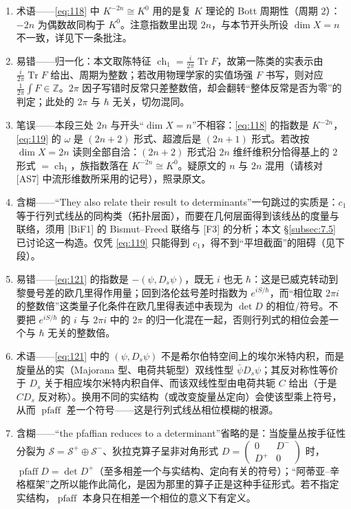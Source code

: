 \documentclass[11pt]{amsart}
\theoremstyle{definition}
\theoremstyle{remark}
\theoremstyle{plain}
\numberwithin{equation}{section}
\renewcommand{\:}{\colon}
\DeclareMathOperator{\Tr}{Tr}
\newcommand{\ZZ}{{\mathbb Z}}
\DeclareMathOperator{\ch}{ch}
\DeclareMathOperator{\pfaff}{pfaff}
\newcommand{\sS}{\mathscr{S}}
\begin{document}
\begin{enumerate}[leftmargin=2.2em,itemsep=2pt,topsep=2pt]
  \item 术语——\eqref{eq:118} 中 $K^{-2n}\cong K^0$ 用的是复 $K$ 理论的 Bott 周期性（周期 $2$）：$-2n$ 为偶数故同构于 $K^0$。注意指数里出现 $2n$，与本节开头所设 $\dim X=n$ 不一致，详见下一条批注。
  \item 易错——归一化：本文取陈特征 $\ch_1=\frac{i}{2\pi}\Tr F$，故第一陈类的实表示由 $\frac{i}{2\pi}\Tr F$ 给出、周期为整数；若改用物理学家的实值场强 $F$ 书写，则对应 $\frac{1}{2\pi}\int F\in \ZZ$。$2\pi$ 因子写错时反常只差整数倍，却会翻转“整体反常是否为零”的判定；此处的 $2\pi$ 与 $\hbar$ 无关，切勿混同。
  \item 笔误——本段三处 $2n$ 与开头“$\dim X=n$”不相容：\eqref{eq:118} 的指数是 $K^{-2n}$，\eqref{eq:119} 的 $\omega $ 是 $(2n+2)$ 形式、超渡后是 $(2n+1)$ 形式。若改按 $\dim X=2n$ 读则全部自洽：$(2n+2)$ 形式沿 $2n$ 维纤维积分恰得基上的 $2$ 形式 $=\ch_1$，族指数落在 $K^{-2n}\cong K^0$。疑原文的 $n$ 与 $2n$ 混用（请核对 [AS7] 中流形维数所采用的记号），照录原文。
  \item 含糊——“They also relate their result to determinants”一句跳过的实质是：$c_1$ 等于行列式线丛的同构类（拓扑层面），而要在几何层面得到该线丛的度量与联络，须用 [BiF1] 的 Bismut–Freed 联络与 [F3] 的分析；本文 §\ref{subsec:7.5} 已讨论这一构造。仅凭 \eqref{eq:119} 只能得到 $c_1$，得不到“平坦截面”的阻碍（见下段）。
  \item 易错——\eqref{eq:121} 的指数是 $-(\psi ,D_s\psi )$，既无 $i$ 也无 $\hbar$：这是已威克转动到黎曼号差的欧几里得作用量；回到洛伦兹号差时指数为 $e^{iS/\hbar}$，而“相位取 $2\pi i$ 的整数倍”这类量子化条件在欧几里得表述中表现为 $\det D$ 的相位/符号。不要把 $e^{iS/\hbar}$ 的 $i$ 与 $2\pi i$ 中的 $2\pi$ 的归一化混在一起，否则行列式的相位会差一个与 $\hbar$ 无关的整数倍。
  \item 术语——\eqref{eq:121} 中的 $(\psi ,D_s\psi )$ 不是希尔伯特空间上的埃尔米特内积，而是旋量丛的实（Majorana 型、电荷共轭型）双线性型 $\bar\psi D_s\psi $；其反对称性等价于 $D_s$ 关于相应埃尔米特内积自伴、而该双线性型由电荷共轭 $C$ 给出（于是 $CD_s$ 反对称）。换用不同的实结构（或改变旋量丛定向）会使该型乘上符号，从而 $\pfaff$ 差一个符号——这是行列式线丛相位模糊的根源。
  \item 含糊——“the pfaffian reduces to a determinant”省略的是：当旋量丛按手征性分裂为 $\sS=\sS^+\oplus \sS^-$、狄拉克算子呈非对角形式 $D=\begin{pmatrix}0&D^-\\D^+&0\end{pmatrix}$ 时，$\pfaff D=\det D^+$（至多相差一个与实结构、定向有关的符号）；“阿蒂亚–辛格框架”之所以能作此简化，是因为那里的算子正是这种手征形式。若不指定实结构，$\pfaff$ 本身只在相差一个相位的意义下有定义。

\end{enumerate}
\end{document}
